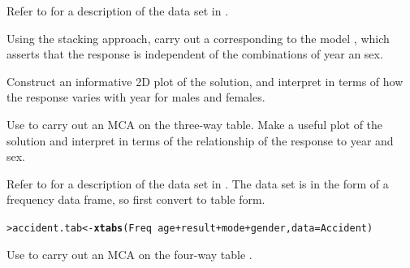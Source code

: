 \documentclass[10pt]{report}\usepackage[]{graphicx}\usepackage[]{color}
\makeatletter
\newcommand{\hlopt}[1]{\textcolor[rgb]{0,0,0}{#1}}%
\newcommand{\hlstd}[1]{\textcolor[rgb]{0.345,0.345,0.345}{#1}}%
\newcommand{\hlkwb}[1]{\textcolor[rgb]{0.69,0.353,0.396}{#1}}%
\newcommand{\hlkwc}[1]{\textcolor[rgb]{0.333,0.667,0.333}{#1}}%
\newcommand{\hlkwd}[1]{\textcolor[rgb]{0.737,0.353,0.396}{\textbf{#1}}}%
\newenvironment{kframe}{%
 \def\at@end@of@kframe{}%
 \ifinner\ifhmode%
  \def\at@end@of@kframe{\end{minipage}}%
  \begin{minipage}{\columnwidth}%
 \fi\fi%
 \def\FrameCommand##1{\hskip\@totalleftmargin \hskip-\fboxsep
 \colorbox{shadecolor}{##1}\hskip-\fboxsep
     \hskip-\linewidth \hskip-\@totalleftmargin \hskip\columnwidth}%
 \MakeFramed {\advance\hsize-\width
   \@totalleftmargin\z@ \linewidth\hsize
   \@setminipage}}%
 {\par\unskip\endMakeFramed%
 \at@end@of@kframe}
\newenvironment{knitrout}{}{} %
\renewenvironment{knitrout}{\small\renewcommand{\baselinestretch}{.85}}{} %
\makeatother
\begin{document}
\begin{Exercises}
\exercise\label{lab:ca-vietnam} Refer to  for a description of the  data set
  in . 
  \begin{enumerate*}
    \item Using the stacking approach, carry out a \ca corresponding to the \loglin model , which asserts
    that the response is independent of the combinations of year an sex.  
    \begin{ans}
    \end{ans}
    
    \item Construct an informative 2D plot of the solution, and interpret in terms of how the response varies with year for
    males and females.
    \begin{ans}
    \end{ans}
    
    \item Use  to carry out an MCA on the three-way table.  Make a useful plot of the solution and interpret
    in terms of the relationship of the response to year and sex.
    \begin{ans}
    \end{ans}
    
  \end{enumerate*}

\exercise\label{lab:ca-accident} Refer to  for a description of the  data set
  in . The data set is in the form of a frequency data frame, so first convert to table form.
\begin{knitrout}\footnotesize
{}\color{fgcolor}\begin{kframe}
\begin{alltt}
\hlstd{> }\hlstd{accident.tab} \hlkwb{<-} \hlkwd{xtabs}\hlstd{(Freq} \hlopt{~} \hlstd{age} \hlopt{+} \hlstd{result} \hlopt{+} \hlstd{mode} \hlopt{+} \hlstd{gender,} \hlkwc{data}\hlstd{=Accident)}
\end{alltt}
\end{kframe}
\end{knitrout}

  \begin{enumerate*}
    \item Use  to carry out an MCA on the four-way table .
    \begin{ans}
    \end{ans}
    

\end{enumerate*}
\end{Exercises}
\end{document}
